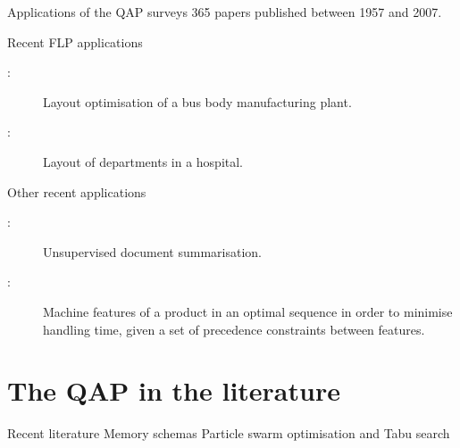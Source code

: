 {{\begin{frame}{Applications of the QAP}
            \citet{Loiola:2007jk} surveys 365 papers published between 1957 and 2007.
        \end{frame}

        \begin{frame}{Recent FLP applications}
            \begin{description}
                \item[\citet{Samanta:2015hk}:] Layout optimisation of a bus body manufacturing plant.
                \item[\citet{XiongfengFeng:2015jo}:] Layout of departments in a hospital.
            \end{description}
        \end{frame}

        \begin{frame}{Other recent applications}
            \begin{description}
                \item[\citet{Alguliyev:2015jw}:] Unsupervised document summarisation.
                \item[\citet{Azab:2015eq}:] Machine features of a product in an optimal sequence in order to minimise handling time, given a set of precedence constraints between features.
            \end{description}
        \end{frame}
    }
}

\section{The QAP in the literature} {
    \begin{frame}{Recent literature}
        Memory schemas \citet{Meneses:2011hg}
        \citet{Harris:2015kw}
        Particle swarm optimisation and Tabu search \citet{Helal:2015de}
    \end{frame}
}

